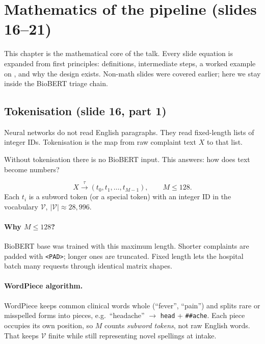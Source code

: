\section{Mathematics of the pipeline (slides 16--21)}
\label{sec:math}

This chapter is the mathematical core of the talk. Every slide equation is expanded from first principles:
definitions, intermediate steps, a worked example on \runningcomplaint{}, and why the design exists.
Non-math slides were covered earlier; here we stay inside the BioBERT triage chain.

\subsection{Tokenisation (slide 16, part 1)}
\label{sec:expl-token}

\begin{intuitbox}
Neural networks do not read English paragraphs. They read fixed-length lists of integer IDs.
Tokenisation is the map from raw complaint text \(X\) to that list.
\end{intuitbox}

\begin{whybox}
Without tokenisation there is no BioBERT input. This answers: how does text become numbers?
\end{whybox}

\begin{definition}
\[
  X \xrightarrow{\tau} (t_0,t_1,\ldots,t_{M-1}), \qquad M \leq 128.
\]
Each \(t_i\) is a subword token (or a special token) with an integer ID in the vocabulary
\(\mathcal{V}\), \(|\mathcal{V}|\approx 28{,}996\).
\end{definition}

\paragraph{Why \(M\leq 128\)?}
BioBERT base was trained with this maximum length. Shorter complaints are padded with \texttt{<PAD>};
longer ones are truncated. Fixed length lets the hospital batch many requests through identical matrix shapes.

\paragraph{WordPiece algorithm.}
WordPiece keeps common clinical words whole (``fever'', ``pain'') and splits rare or misspelled forms
into pieces, e.g.\ ``headache'' \(\to\) \texttt{head} + \texttt{\#\#ache}.
Each piece occupies its own position, so \(M\) counts \emph{subword tokens}, not raw English words.
That keeps \(\mathcal{V}\) finite while still representing novel spellings at intake.

